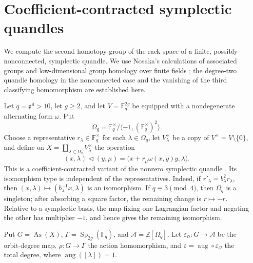 \documentclass[11pt]{article}
\DeclareMathOperator{\As}{As}
\newcommand{\ZZ}{\mathbb Z}
\newcommand{\OO}{\mathcal O}
\begin{document}
\section{Coefficient-contracted symplectic quandles}

We compute the second homotopy group of the rack space of a finite, possibly
nonconnected, symplectic quandle. We use Nosaka's calculations of associated
groups and low-dimensional group homology over finite fields
\cite[\S4.2]{NosakaAdjoint}; the degree-two quandle homology in the
nonconnected case and the vanishing of the third classifying homomorphism are
established here.

Let $q=\mathfrak p^d>10$, let $g\ge2$, and let
$V=\mathbb F_q^{2g}$ be equipped with a nondegenerate alternating form
$\omega$. Put
\[
 \Omega_q=\mathbb F_q^\times/
 \langle-1,(\mathbb F_q^\times)^2\rangle.
\]
Choose a representative $r_\lambda\in\mathbb F_q^\times$ for each
$\lambda\in\Omega_q$, let $V_\lambda^\times$ be a copy of
$V^\times=V\setminus\{0\}$, and define on
$X=\coprod_{\lambda\in\Omega_q}V_\lambda^\times$ the operation
\begin{equation}
 (x,\lambda)\lhd(y,\mu)
 =\bigl(x+r_\mu\omega(x,y)y,\lambda\bigr).
\label{eq:symp-operation}
\end{equation}
This is a coefficient-contracted variant of the nonzero symplectic quandle
\cite{NavasNelson}. Its isomorphism type is independent of the representatives.
Indeed, if $r'_\lambda=b_\lambda^2r_\lambda$, then
$(x,\lambda)\mapsto(b_\lambda^{-1}x,\lambda)$ is an isomorphism. If
$q\equiv3\pmod4$, then $\Omega_q$ is a singleton; after absorbing a square
factor, the remaining change is $r\mapsto-r$. Relative to a symplectic basis,
the map fixing one Lagrangian factor and negating the other has multiplier
$-1$, and hence gives the remaining isomorphism.

Put $G=\As(X)$, $\Gamma=\operatorname{Sp}_{2g}(\mathbb F_q)$, and
$\mathcal A=\ZZ[\Omega_q]$. Let
$\varepsilon_{\OO}\colon G\to\mathcal A$ be the orbit-degree map,
$\rho\colon G\to\Gamma$ the action homomorphism, and
$\varepsilon=\operatorname{aug}\circ\varepsilon_{\OO}$ the total degree,
where $\operatorname{aug}([\lambda])=1$.
\end{document}
